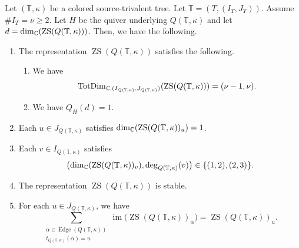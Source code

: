 \begin{lemma}\label{lem:reflected-blocks}
Let $(\mathbb T,\kappa)$ be a colored source-trivalent tree.
Let $\mathbb T=(T,(I_T,J_T))$.
Assume $\#I_{T}=\nu\ge2$.
Let $H$ be the quiver underlying $Q(\mathbb T,\kappa)$ and let $d=\dim_{\mathbb C}(\operatorname{ZS}(Q(\mathbb T,\kappa)))$.
Then, we have the following.

\begin{enumerate}
\item\label{c:reflected-blocks-dimension} The representation $\operatorname{ZS}(Q(\mathbb T,\kappa))$ satisfies the following.
\begin{enumerate}[label=(\alph*),ref=\theenumi(\alph*)]
\item\label{c:reflected-blocks-dimension-vector} We have
\[
 \operatorname{TotDim}_{\mathbb C,(I_{Q(\mathbb T,\kappa)},J_{Q(\mathbb T,\kappa)})}(\operatorname{ZS}(Q(\mathbb T,\kappa)))=(\nu-1,\nu).
\]
\item\label{c:reflected-blocks-tits} We have $Q_H(d)=1$.
\end{enumerate}
\item\label{c:reflected-blocks-sinks} Each $u\in J_{Q(\mathbb T,\kappa)}$ satisfies
$\dim_{\mathbb C}(\operatorname{ZS}(Q(\mathbb T,\kappa))_u)=1$.
\item\label{c:reflected-blocks-sources} Each $v\in I_{Q(\mathbb T,\kappa)}$ satisfies
\[
 \bigl(\dim_{\mathbb C}(\operatorname{ZS}(Q(\mathbb T,\kappa))_v),\deg_{Q(\mathbb T,\kappa)}(v)\bigr)
 \in\{(1,2),(2,3)\}.
\]
\item\label{c:reflected-blocks-stable} The representation $\operatorname{ZS}(Q(\mathbb T,\kappa))$ is stable.
\item\label{c:reflected-blocks-generation} For each $u\in J_{Q(\mathbb T,\kappa)}$, we have
\[
 \sum_{\substack{\alpha\in\operatorname{Edge}(Q(\mathbb T,\kappa))\\t_{Q(\mathbb T,\kappa)}(\alpha)=u}}
 \operatorname{im}\bigl(\operatorname{ZS}(Q(\mathbb T,\kappa))_\alpha\bigr)
 =\operatorname{ZS}(Q(\mathbb T,\kappa))_u.
\]
\end{enumerate}
\end{lemma}
